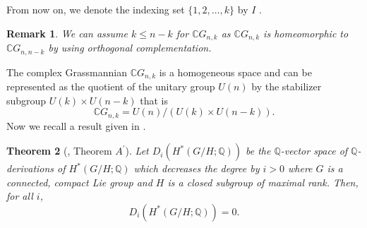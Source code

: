 \documentclass{amsart}
\newtheorem{theorem}{Theorem}[section]
\newtheorem{remark}[theorem]{Remark}
\newcommand{\rank}{\mathrm{Rank}}
\begin{document}
	From %
now on, we %
denote the indexing set $\{1,2,\dots, k\}$ by $I$%
.
	\begin{remark}
		We can assume  $k\leq n-k$ for  $\mathbb{C}G_{n,k}$ as $\mathbb{C}G_{n,k}$ is homeomorphic to $\mathbb{C}G_{n,n-k}$ by using orthogonal complementation.
	\end{remark}
	The %
complex Grassmannian $\mathbb{C}G_{n,k}$ is a homogeneous space and can be represented as the quotient of the unitary group $U(n)$ by the stabilizer subgroup %
$U(k)\times U(n-k)$ that is 
	\begin{equation}\label{cgn as hom}
		\mathbb{C}G_{n,k} = U(n)/ (U(k)\times U(n-k)). 
	\end{equation} Now %
we recall a result given %
in \cite{shiga-tezuka}.    
	\begin{theorem}[\cite{shiga-tezuka}, Theorem \(A^{'}\)]\label{Tezuka}
		Let %
$D_i(H^*(G/H;\mathbb{Q}))$ be the $\mathbb{Q}$-vector space of $\mathbb{Q}$-derivations of $H^*(G/H;\mathbb{Q})$ which decreases the degree %
by $i>0$ where %
$G$ is a connected, compact Lie group and $H$ is a closed subgroup of maximal %
rank.
		Then, for %
all $i$, $$D_i(H^*(G/H;\mathbb{Q})) =0.$$  
	\end{theorem}
\end{document}
